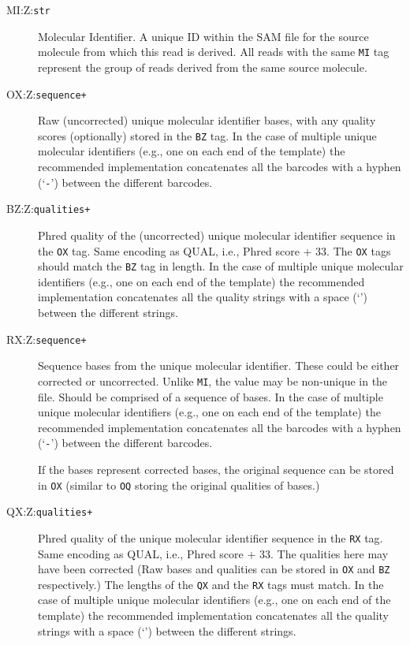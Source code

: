 \documentclass[10pt]{article}
\newcommand{\tagvalue}[1]{\tt #1}
\begin{document}
\begin{description}
\item[MI:Z:\tagvalue{str}]
Molecular Identifier. 
A unique ID within the SAM file for the source molecule from which this read is derived. 
All reads with the same {\tt MI} tag represent the group of reads derived from the same source molecule. 

\item[OX:Z:\tagvalue{sequence+}] 
Raw (uncorrected) unique molecular identifier bases, with any quality scores (optionally) stored in the {\tt BZ} tag. 
In the case of multiple unique molecular identifiers (e.g., one on each end of the template) the recommended implementation concatenates all the barcodes with a hyphen (`{\tt -}') between the different barcodes.

\item[BZ:Z:\tagvalue{qualities+}] 
Phred quality of the (uncorrected) unique molecular identifier sequence in the {\tt OX} tag.
Same encoding as {\sf QUAL}, i.e., Phred score + 33.
The {\tt OX} tags should match the {\tt BZ} tag in length. 
In the case of multiple unique molecular identifiers (e.g., one on each end of the template) the recommended implementation concatenates all the quality strings with a space (`{\tt \textvisiblespace}') between the different strings.

\item[RX:Z:\tagvalue{sequence+}]
Sequence bases from the unique molecular identifier.
These could be either corrected or uncorrected. Unlike {\tt MI}, the value may be non-unique in the file.
Should be comprised of a sequence of bases.
In the case of multiple unique molecular identifiers (e.g., one on each end of the template) the recommended implementation concatenates all the barcodes with a hyphen (`{\tt -}') between the different barcodes.

If the bases represent corrected bases, the original sequence can be stored in {\tt OX} (similar to {\tt OQ} storing the original qualities of bases.)

\item[QX:Z:\tagvalue{qualities+}]
Phred quality of the unique molecular identifier sequence in the {\tt RX} tag.
Same encoding as {\sf QUAL}, i.e., Phred score + 33.
The qualities here may have been corrected (Raw bases and qualities can be stored in {\tt OX} and {\tt BZ} respectively.)
The lengths of the {\tt QX} and the {\tt RX} tags must match.
In the case of multiple unique molecular identifiers (e.g., one on each end of the template) the recommended implementation concatenates all the quality strings with a space (`{\tt \textvisiblespace}') between the different strings.
\end{description}
\end{document}

